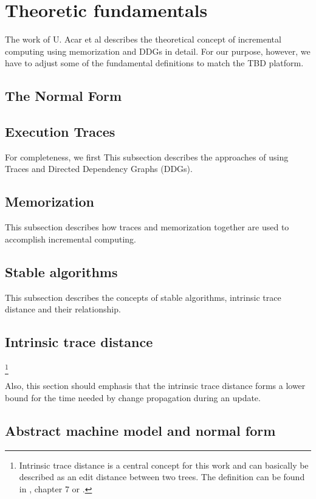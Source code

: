 \section{Theoretic fundamentals}
\label{sec:ddg_memo}
The work of U. Acar et al\cite{Acar2005thesis} describes the theoretical concept of incremental computing using memorization and DDGs in detail. For our purpose, however, we have to adjust some of the fundamental definitions to match the TBD platform. 

\subsection{The Normal Form}


\subsection{Execution Traces}
For completeness, we first 
This subsection describes the approaches of using Traces and Directed Dependency Graphs (DDGs). \cite{Acar2005thesis}

\subsection{Memorization}
This subsection describes how traces and memorization together are used to accomplish incremental computing. \cite{Acar2005thesis}

\subsection{Stable algorithms}
This subsection describes the concepts of stable algorithms, intrinsic trace distance and their relationship. 

\subsection{Intrinsic trace distance}
\footnote{Intrinsic trace distance is a central concept for this work and can basically be described as an edit distance between two trees. 
The definition can be found in \cite{Acar2005thesis}, chapter 7 or \cite{acar2004dynamizing}.}

Also, this section should emphasis that the intrinsic trace distance forms a lower bound for the time needed by change propagation during an update. \cite{Acar2005thesis} 
\subsection{Abstract machine model and normal form}

